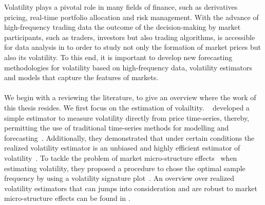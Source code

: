 \documentclass[11pt, a4paper]{thesis}  %
\begin{document}
%
Volatility plays a pivotal role in many fields of finance, such as derivatives pricing, real-time portfolio allocation and risk management. With the advance of high-frequency trading data the outcome of the decision-making by market participants, such as traders, investors but also trading algorithms, is accessible for data analysis in to order to study not only  the formation of market prices but also its volatility. To this end, it is important to develop new forecasting methodologies for volatility based on high-frequency data,  volatility estimators and models that capture the features of markets. 
%
%
\\
\\
\noindent We begin with a reviewing the literature, to give an overview where the work of this thesis resides. We first focus on the estimation of volailtity. \citeauthor{Anderson:2000:GreatRealisations}~\cite{Anderson:2000:GreatRealisations} developed a simple estimator to measure volatility directly from price time-series, thereby, permitting the use of traditional time-series methods for modelling and forecasting~\cite{Andersen:2003:modeling_forcasting_rv}. Additionally, they demonstrated that under certain conditions the realized volatility estimator is an unbiased and highly efficient estimator of volatility~\cite{Andersen:2001:RealizedVol,Andersen:1998cb, Anderson:2000:GreatRealisations}. To tackle the problem of market micro-structure effects~\cite{Phillips:2005:comment_micro_structure, Hansen:2006:micro_structure, Yacine:2009:micro_structure,Anderson:2011:micro_structure} when estimating volatility, they proposed a procedure to chose the optimal sample frequency by using a volatility signature plot~\citep{Anderson:2000:GreatRealisations}. An overview over realized volatility estimators that can jumps into consideration and are robust to market micro-structure effects can be found in \cite{Andersen:2010:volatility_measurement}.
\end{document}
